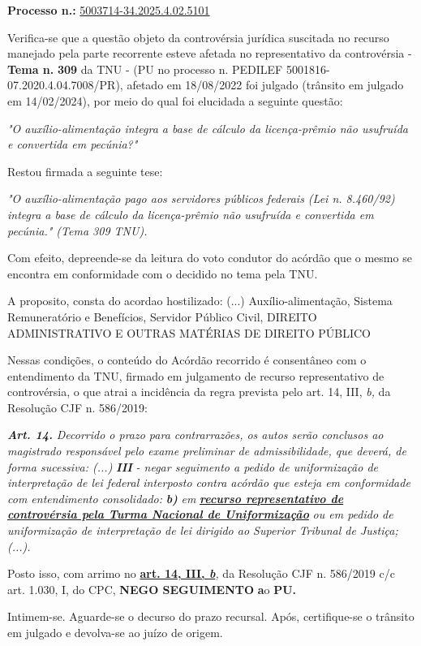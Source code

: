 \documentclass[12pt]{article}
\begin{document}
\justifying
\noindent \textbf{Processo n.: }\uline{5003714-34.2025.4.02.5101}

\noindent Verifica-se que a questão objeto da controvérsia jurídica suscitada no recurso manejado pela parte recorrente esteve afetada no representativo da controvérsia - \textbf{Tema n. }\textbf{309} da TNU - (PU no processo n. PEDILEF 5001816-07.2020.4.04.7008/PR),  afetado em 18/08/2022 foi julgado (trânsito em julgado em 14/02/2024), por meio do qual foi elucidada a seguinte questão:

\noindent \textit{"O auxílio-alimentação integra a base de cálculo da licença-prêmio não usufruída e convertida em pecúnia?"}

\noindent Restou firmada a seguinte tese:

\noindent \textit{"O auxílio-alimentação pago aos servidores públicos federais (Lei n. 8.460/92) integra a base de cálculo da licença-prêmio não usufruída e convertida em pecúnia." (Tema 309 TNU).}

\noindent Com efeito, depreende-se da leitura do voto condutor do acórdão que o mesmo se encontra em conformidade com o decidido no  tema pela TNU.

\noindent A proposito, consta do acordao hostilizado: (...) Auxílio-alimentação, Sistema Remuneratório e Benefícios, Servidor Público Civil, DIREITO ADMINISTRATIVO E OUTRAS MATÉRIAS DE DIREITO PÚBLICO

\noindent Nessas condições, o conteúdo do Acórdão recorrido é consentâneo com o entendimento da TNU, firmado em julgamento de recurso representativo de controvérsia, o que atrai a incidência da regra prevista pelo art. 14, III, \textit{b,} da Resolução CJF n. 586/2019:

\noindent \textit{\textbf{Art. 14.}}\textit{ Decorrido o prazo para contrarrazões, os autos serão conclusos ao magistrado responsável pelo exame preliminar de admissibilidade, que deverá, de forma sucessiva: (...) }\textit{\textbf{III }}\textit{- negar seguimento a pedido de uniformização de interpretação de lei federal interposto contra acórdão que esteja em conformidade com entendimento consolidado: }\textit{\textbf{b)}}\textit{ em }\textit{\textbf{\uline{recurso representativo de controvérsia pela Turma Nacional de Uniformização}}}\textit{ ou em pedido de uniformização de interpretação de lei dirigido ao Superior Tribunal de Justiça;(...).}

\noindent Posto isso, com arrimo no \textbf{\uline{art. 14, III, }}\textit{\textbf{\uline{b}}}\textit{,} da Resolução CJF n. 586/2019 c/c art. 1.030, I, do CPC, \textbf{NEGO SEGUIMENTO }\textbf{a}o\textbf{ PU}\textbf{.}

\noindent Intimem-se. Aguarde-se o decurso do prazo recursal. Após, certifique-se o trânsito em julgado e devolva-se ao juízo de origem.
\end{document}
